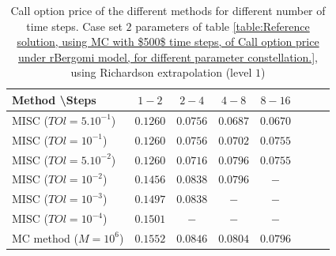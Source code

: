 \documentclass[11pt]{article}
\begin{document}
\begin{table}[h!]
	\centering
	\begin{tabular}{l*{6}{c}r}
		Method \textbackslash  Steps    &$1-2$         & $2-4$ & $4-8$ & $8-16$\\
		\hline
		MISC ($TOl=5.10^{-1}$)  &$0.1260$ & $0.0756$ & $0.0687$ & $0.0670$ \\
		MISC ($TOl=10^{-1}$)  &$0.1260$ & $0.0756$ & $0.0702$ & $0.0755$  \\
		MISC ($TOl=5.10^{-2}$)   &$0.1260$ & $0.0716$ & $0.0796$ &$0.0755$   \\
		MISC ($TOl=10^{-2}$)  &$0.1456$ & $0.0838$ & $0.0796$ & $-$  \\	
		MISC ($TOl=10^{-3}$)  &$0.1497$ & $0.0838$ & $-$ & $-$ \\

		MISC ($TOl=10^{-4}$)  &$0.1501$ & $-$ & $-$ & $-$ \\
		\hline
		MC method ($M=10^{6}$)   & $0.1552 $  & $0.0846 $  & $0.0804$ & $0.0796 $ \\		
		\hline
	\end{tabular}
	\caption{Call option price of the different methods for different number of time steps. Case set $2$ parameters of table \ref{table:Reference solution, using MC with $500$ time steps, of Call option price under rBergomi model, for different parameter constellation.}, using Richardson extrapolation (level $1$)}
	\label{table:  Call option price of the different methods for different number of time steps. Case set $2$ parameter, using Richardson extrapolation (level $1$),linear}
\end{table}
\end{document}
